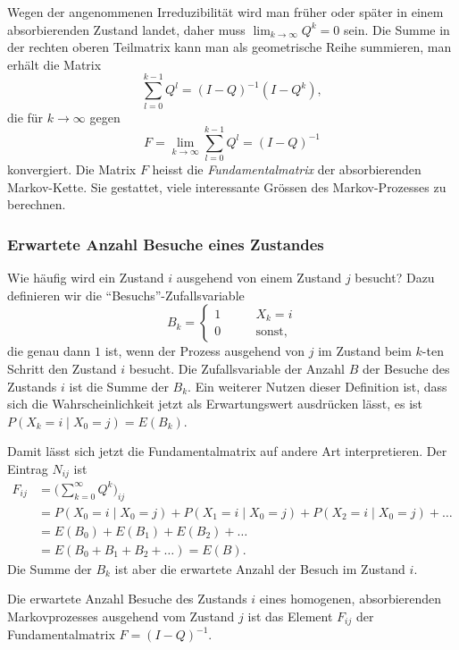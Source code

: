 Wegen der angenommenen Irreduzibilität wird man
früher oder später in einem absorbierenden Zustand landet,
daher muss $\lim_{k\to\infty} Q^k=0$ sein.
Die Summe in der rechten oberen Teilmatrix kann man als geometrische
Reihe summieren, man erhält die Matrix
\[
\sum_{l=0}^{k-1} Q^l = (I-Q)^{-1}(I-Q^k),
\]
die für $k\to\infty$ gegen
\[
F
=
\lim_{k\to\infty} \sum_{l=0}^{k-1} Q^l
=
(I-Q)^{-1}
\]
konvergiert.
Die Matrix $F$ heisst die {\em Fundamentalmatrix} der absorbierenden
Markov-Kette.
%
Sie gestattet, viele interessante Grössen des Markov-Prozesses zu
berechnen.

\subsubsection{Erwartete Anzahl Besuche eines Zustandes}
Wie häufig wird ein Zustand $i$ ausgehend von einem Zustand $j$
besucht?
%
Dazu definieren wir die ``Besuchs''-Zufallsvariable
\[
B_{k}=\begin{cases}
1&\qquad\text{$X_k=i$}\\
0&\qquad\text{sonst,}
\end{cases}
\]
die genau dann $1$ ist, wenn der Prozess ausgehend von $j$ im Zustand
beim $k$-ten Schritt den Zustand $i$ besucht.
Die Zufallsvariable der Anzahl $B$ der Besuche des Zustands $i$ ist die
Summe der $B_k$.
Ein weiterer Nutzen dieser Definition ist, dass sich die Wahrscheinlichkeit
jetzt als Erwartungswert ausdrücken lässt, es ist
$P(X_k=i \mid X_0=j) = E(B_k)$.

Damit lässt sich jetzt die Fundamentalmatrix auf andere Art interpretieren.
Der Eintrag $N_{i\!j}$ ist
\begin{align*}
F_{i\!j}
&=
\biggl(\sum_{k=0}^\infty Q^k\biggr)_{i\!j}
\\
&=
P(X_0=i\mid X_0=j)
+
P(X_1=i\mid X_0=j)
+
P(X_2=i\mid X_0=j)
+\dots
\\
&=E(B_0) + E(B_1) + E(B_2) + \dots
\\
&=E(B_0+B_1+B_2+\dots)
=E(B).
\end{align*}
Die Summe der $B_k$ ist aber die erwartete Anzahl der Besuch im Zustand $i$.

\begin{satz}
\label{buch:markov:satz:anzahlbesuche}
Die erwartete Anzahl Besuche des Zustands $i$ eines homogenen,
absorbierenden Markovprozesses ausgehend vom Zustand $j$ ist das
Element $F_{i\!j}$ der Fundamentalmatrix $F=(I-Q)^{-1}$.
\end{satz}

